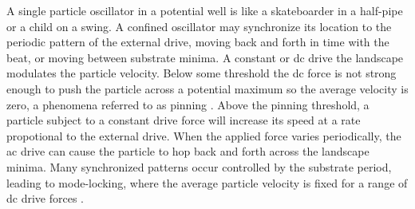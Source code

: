 \documentclass[twocolumn,preprintnumbers,amsmath,amssymb,aps,prx]{revtex4}
\begin{document}
A single particle oscillator
in a potential well is 
like a skateboarder in a half-pipe or
a child on a swing.
 A confined oscillator may 
 synchronize its location
 to the periodic pattern of the external drive,
 moving back and forth in time with
 the beat,
 or moving between substrate minima.
 A constant or 
 dc drive the landscape modulates 
 the particle velocity.
 Below some threshold  
 the dc force is not strong enough to push the particle
 across a potential maximum so the average velocity is zero,
 a phenomena referred to as pinning \cite{Reichhardt2017}.
 Above the pinning threshold,
 a particle subject to a constant
 drive force will increase its speed at a rate propotional
 to the external drive.  
 When the applied force varies periodically,
 the ac drive can 
 cause the particle to hop back and forth across
 the landscape minima.
 Many synchronized patterns occur
 controlled by the substrate period,
 leading to 
 mode-locking,
 where the average particle velocity
 is fixed for a range of dc drive forces \cite{Reichhardt2015}.



 
\end{document}
